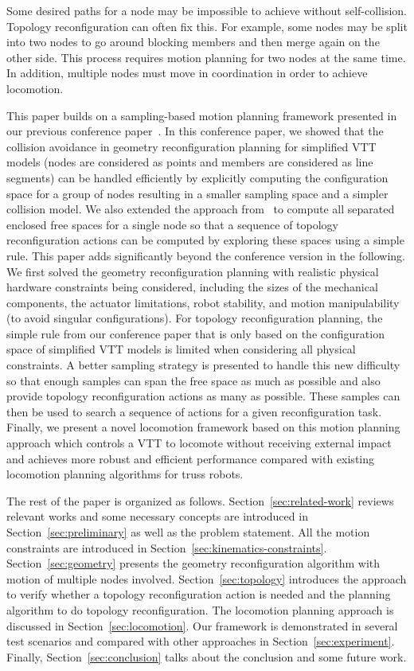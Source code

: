 \documentclass[journal]{IEEEtran}
\begin{document}
Some desired paths for a node may be impossible to achieve without
self-collision.  Topology reconfiguration can often fix this. For
example, some nodes may be split into two nodes to go around blocking
members and then merge again on the other side. This process requires
motion planning for two nodes at the same time. In addition, multiple
nodes must move in coordination in order to achieve locomotion.

This paper builds on a sampling-based motion planning framework
presented in our previous conference paper~\cite{Liu-vtt-rss-2020}. In
this conference paper, we showed that the collision avoidance in
geometry reconfiguration planning for simplified VTT models (nodes are
considered as points and members are considered as line segments) can
be handled efficiently by explicitly computing the configuration space
for a group of nodes resulting in a smaller sampling space and a
simpler collision model. We also extended the approach
from~\cite{Liu-vtt-cspace-icra-2020} to compute all separated enclosed
free spaces for a single node so that a sequence of topology
reconfiguration actions can be computed by exploring these spaces
using a simple rule. This paper adds significantly beyond the
conference version in the following. We first solved the geometry
reconfiguration planning with realistic physical hardware constraints
being considered, including the sizes of the mechanical components,
the actuator limitations, robot stability, and motion manipulability
(to avoid singular configurations). For topology reconfiguration
planning, the simple rule from our conference paper that is only based
on the configuration space of simplified VTT models is limited when
considering all physical constraints. A better sampling strategy is
presented to handle this new difficulty so that enough samples can
span the free space as much as possible and also provide topology
reconfiguration actions as many as possible. These samples can then be
used to search a sequence of actions for a given reconfiguration
task. Finally, we present a novel locomotion framework based on this
motion planning approach which controls a VTT to locomote without
receiving external impact and achieves more robust and efficient
performance compared with existing locomotion planning algorithms for
truss robots.

The rest of the paper is organized as
follows. Section~\ref{sec:related-work} reviews relevant works and
some necessary concepts are introduced in
Section~\ref{sec:preliminary} as well as the problem statement. All
the motion constraints are introduced in
Section~\ref{sec:kinematics-constraints}. Section~\ref{sec:geometry}
presents the geometry reconfiguration algorithm with motion of
multiple nodes involved. Section~\ref{sec:topology} introduces the
approach to verify whether a topology reconfiguration action is needed
and the planning algorithm to do topology reconfiguration. The
locomotion planning approach is discussed in
Section~\ref{sec:locomotion}. Our framework is demonstrated in several
test scenarios and compared with other approaches in
Section~\ref{sec:experiment}. Finally, Section~\ref{sec:conclusion}
talks about the conclusion and some future work.
\end{document}
